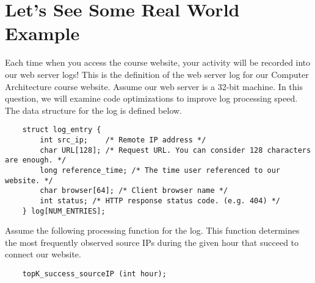 \section{Let's See Some Real World Example}

Each time when you access the course website, your activity will be
recorded into our web server logs! This is the definition of the web
server log for our Computer Architecture course website. Assume our
web server is a 32-bit machine. In this question, we will examine
code optimizations to improve log processing speed. The data
structure for the log is defined below.
\begin{verbatim}
    struct log_entry {
        int src_ip;    /* Remote IP address */
        char URL[128]; /* Request URL. You can consider 128 characters are enough. */
        long reference_time; /* The time user referenced to our website. */
        char browser[64]; /* Client browser name */
        int status; /* HTTP response status code. (e.g. 404) */
    } log[NUM_ENTRIES];
\end{verbatim}
Assume the following processing function for the log. This function
determines the most frequently observed source IPs during the given
hour that succeed to connect our website.

\begin{verbatim}
    topK_success_sourceIP (int hour);
\end{verbatim}

